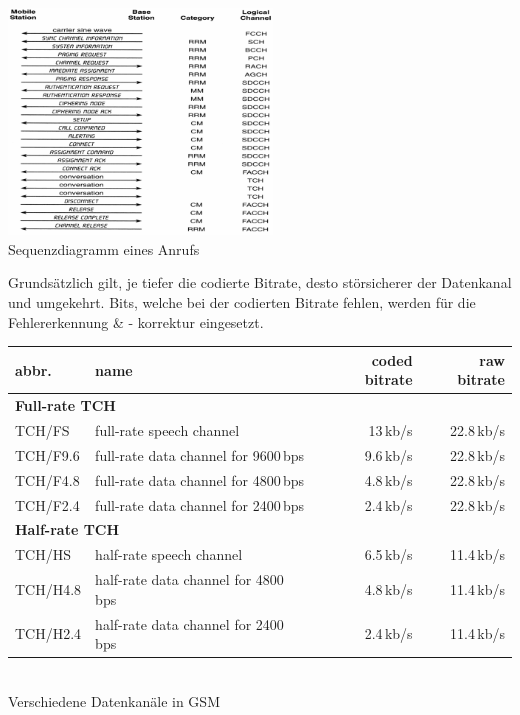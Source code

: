     \begin{minipage}{7.3cm}        
        \begin{center}
	        \includegraphics[width=7cm]{./bilder/systems-callEstablishment.png}    \\
	        Sequenzdiagramm eines Anrufs            
        \end{center}    
    \end{minipage}
    \begin{minipage}{12cm}  
        Grundsätzlich gilt, je tiefer die codierte Bitrate, desto störsicherer der Datenkanal und
        umgekehrt. Bits, welche bei der codierten Bitrate fehlen, werden für die Fehlererkennung \&
        - korrektur eingesetzt. 
        \begin{center}
            \small       
            \begin{tabular}{|l|l|r|r|}\hline
            abbr.     & name       & coded bitrate & raw bitrate \\ \hline \hline
            \multicolumn{4}{|l|}{\bf Full-rate TCH} \\ \hline
            TCH/FS    & full-rate speech channel & 13\,kb/s & 22.8\,kb/s \\ \hline
            TCH/F9.6  & full-rate data channel for 9600\,bps
                      & 9.6\,kb/s & 22.8\,kb/s \\ \hline
            TCH/F4.8  & full-rate data channel for 4800\,bps
                      & 4.8\,kb/s & 22.8\,kb/s \\ \hline
            TCH/F2.4  & full-rate data channel for 2400\,bps
                      & 2.4\,kb/s & 22.8\,kb/s \\ \hline \hline
            \multicolumn{4}{|l|}{\bf Half-rate TCH} \\ \hline
            TCH/HS    & half-rate speech channel & 6.5\,kb/s & 11.4\,kb/s \\ \hline
            TCH/H4.8  & half-rate data channel for 4800\,bps
                      & 4.8\,kb/s & 11.4\,kb/s \\ \hline
            TCH/H2.4  & half-rate data channel for 2400\,bps
                      & 2.4\,kb/s & 11.4\,kb/s \\ \hline 
            \end{tabular} \\
            Verschiedene Datenkanäle in GSM
            \normalsize
        \end{center}          
    \end{minipage}



